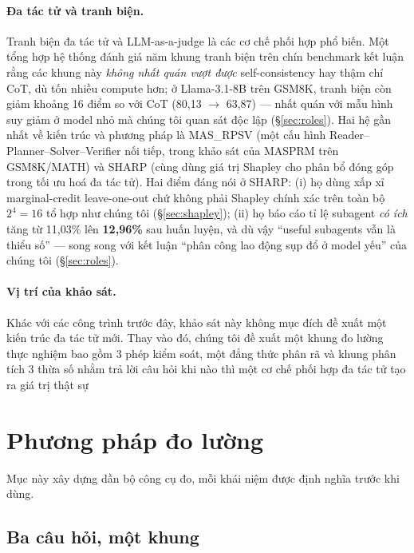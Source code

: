 \documentclass[11pt,a4paper]{article}
\begin{document}
\paragraph{Đa tác tử và tranh biện.} Tranh biện đa tác tử \cite{du2024} và LLM-as-a-judge
\cite{zheng2023} là các cơ chế phối hợp phổ biến. Một tổng hợp hệ thống \cite{mad2025baseline}
đánh giá năm khung tranh biện trên chín benchmark kết luận rằng các khung này \emph{không nhất
quán vượt được} self-consistency hay thậm chí CoT, dù tốn nhiều compute hơn; ở Llama-3.1-8B trên
GSM8K, tranh biện còn giảm khoảng 16 điểm so với CoT (80,13 $\to$ 63,87) --- nhất quán với mẫu
hình suy giảm ở model nhỏ mà chúng tôi quan sát độc lập (\S\ref{sec:roles}). Hai hệ gần nhất về
kiến trúc và phương pháp là MAS\_RPSV (một cấu hình Reader--Planner--Solver--Verifier nối tiếp,
trong khảo sát của MASPRM \cite{masprm2025} trên GSM8K/MATH) và SHARP \cite{sharp2025} (cùng
dùng giá trị Shapley cho phân bổ đóng góp trong tối ưu hoá đa tác tử). Hai điểm đáng nói ở SHARP:
(i) họ dùng xấp xỉ marginal-credit leave-one-out chứ không phải Shapley chính xác trên toàn bộ
$2^4=16$ tổ hợp như chúng tôi (\S\ref{sec:shapley}); (ii) họ báo cáo tỉ lệ subagent \emph{có ích}
tăng từ 11,03\% lên \textbf{12,96\%} sau huấn luyện, và dù vậy ``useful subagents vẫn là thiểu
số'' --- song song với kết luận ``phân công lao động sụp đổ ở model yếu'' của chúng tôi
(\S\ref{sec:roles}).


\paragraph{Vị trí của khảo sát.} Khác với các công trình trước đây, khảo sát này không mục đích đề xuất một kiến trúc đa tác tử mới. Thay vào đó, chúng tôi đề xuất một khung đo lường thực nghiệm bao gồm 3 phép kiểm soát, một đẳng thức phân rã và khung phân tích 3 thừa số nhằm trả lời câu hỏi khi nào thì một cơ chế phối hợp đa tác tử tạo ra giá trị thật sự

\section{Phương pháp đo lường}\label{sec:framework}

Mục này xây dựng dần bộ công cụ đo, mỗi khái niệm được định nghĩa trước khi dùng.

\subsection{Ba câu hỏi, một khung}\label{sec:threeq}
\end{document}
